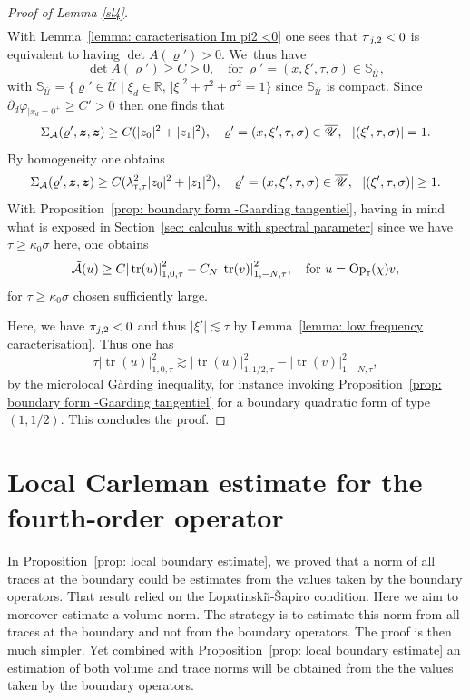 \documentclass[10pt]{amsart}
\let\sep\mid
\theoremstyle{plain}
\theoremstyle{definition}
\def\R{\mathbb{R}}
\newcommand{\LS}{Lopatinski\u{\i}-\v{S}apiro\xspace}
\newcommand{\suff}{sufficiently\xspace}
\let\k\kappa
\let\y\varrho
\let \Re \relax
\DeclareMathOperator{\Re}{Re}
\let \Im \relax
\DeclareMathOperator{\Im}{Im}
\newcommand{\ovl}[1]{\overline{#1}}
\newcommand{\un}[1]{\Sigma_{#1}}
\newcommand{\U}{\mathscr U}
\newcommand{\z}{\boldsymbol{z}}
\newcommand{\br}{\ensuremath{_{|x_d=0^+}}}
\newcommand{\Opt}{\ensuremath{\mathrm{Op}_{\scriptscriptstyle{\mathsf{T}}}}}
\newcommand{\normsc}[2]{{| #1 |}_{#2, \tau}}
\newcommand{\lsct}{\lambda_{{\scriptscriptstyle{\mathsf T}},\tau}}
\DeclareMathOperator{\trace}{tr}
\begin{document}
\begin{proof}[ Proof of Lemma \ref{sl4}]
\begin{multline*}
\end{multline*}
With Lemma~\ref{lemma: caracterisation Im pi2 <0} one sees that $\Im \pi_{j,2}<0$
is equivalent to having $\det A (\y') > 0$.
We~thus have
\begin{equation*}
\det A (\y') \geq C>0,
\quad \text{for} \ \y' = (x,\xi',\tau,\sigma)\in
\mathbb{S}_{\ovl{\U}},
\end{equation*}
with $\mathbb{S}_{\ovl{\U}}=\{\y'\in
\ovl{\U}\sep \xi_d\in\R,\, |\xi|^2+\tau^2+\sigma^2=1\}$ since
$\mathbb{S}_{\ovl{\U}}$ is compact.
Since $\partial_d\varphi\br\geq C' >0$ then one finds that
\[
\Re \un{\mathcal A}(\y',\z,\z) \geq C (|z_0|^2 + |z_1|^2),\quad
\y' = (x,\xi',\tau,\sigma)\in\ovl{\U},
\ \ |(\xi',\tau,\sigma)|= 1.
\]
By homogeneity one obtains
\[
\Re \un{\mathcal A}(\y',\z,\z) \geq C (\lsct^2 |z_0|^2 + |z_1|^2),\quad
\y' = (x,\xi',\tau,\sigma)\in\ovl{\U},
\ \ |(\xi',\tau,\sigma)|\geq 1.
\]
With Proposition~\ref{prop: boundary form -Gaarding tangentiel}, having in mind what is exposed in
Section~\ref{sec: calculus with spectral parameter} since we have
$\tau \geq \k_0 \sigma$ here, one obtains
\begin{equation*}
\Re\mathcal{\tilde{A}}(u)
\geq C \normsc{\trace (u)}{1,0}^2
-C_N \normsc{\trace(v)}{1,-N}^2,
\quad \text{for}\ u = \Opt(\chi)v,
\end{equation*}
for $\tau\geq \k_0\sigma$ chosen \suff large.

Here, we have $\Im \pi_{j,2} <0$ and thus $|\xi'| \lesssim \tau$ by
Lemma~\ref{lemma: low frequency caracterisation}. Thus one has
\begin{equation*}
\tau \normsc{\trace (u)}{1,0}^2 \gtrsim \normsc{\trace (u)}{1,1/2}^2
- \normsc{\trace(v)}{1,-N}^2,
\end{equation*}
by the microlocal G{\aa}rding inequality, for instance invoking
Proposition~\ref{prop: boundary form -Gaarding tangentiel} for a boundary quadratic form of type $(1,1/2)$. This concludes the proof.
\end{proof}

\section{Local Carleman estimate for the fourth-order operator}
\label{sec: Local Carleman estimate for the fouth-order operator}

In Proposition~\ref{prop: local boundary estimate}, we proved that a
norm of all traces at the boundary could be estimates from the values
taken by the boundary operators. That result relied on the \LS
condition. Here we aim to moreover estimate a volume norm. The
strategy is to estimate this norm from all traces at the boundary and
not from the boundary operators. The proof is then much simpler. Yet
combined with Proposition~\ref{prop: local boundary estimate} an
estimation of both volume and trace norms will be obtained from the
the values taken by the boundary operators.
\end{document}
